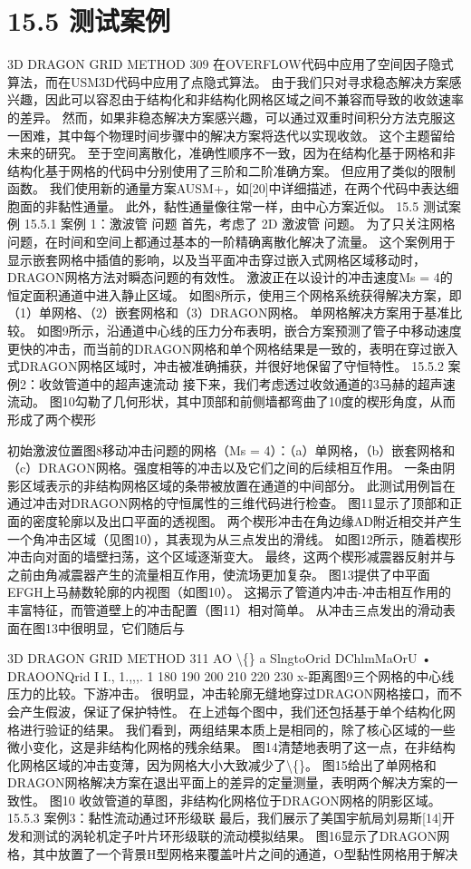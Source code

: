\documentclass[UTF8,11pt,a4paper,openany,fontset=fandol]{ctexbook}
\begin{document}
\section{15.5 测试案例}
3D DRAGON GRID METHOD 309 在OVERFLOW代码中应用了空间因子隐式算法，而在USM3D代码中应用了点隐式算法。 由于我们只对寻求稳态解决方案感兴趣，因此可以容忍由于结构化和非结构化网格区域之间不兼容而导致的收敛速率的差异。 然而，如果非稳态解决方案感兴趣，可以通过双重时间积分方法克服这一困难，其中每个物理时间步骤中的解决方案将迭代以实现收敛。 这个主题留给未来的研究。 至于空间离散化，准确性顺序不一致，因为在结构化基于网格和非结构化基于网格的代码中分别使用了三阶和二阶准确方案。 但应用了类似的限制函数。 我们使用新的通量方案AUSM+，如[20]中详细描述，在两个代码中表达细胞面的非黏性通量。 此外，黏性通量像往常一样，由中心方案近似。 15.5 测试案例 15.5.1 案例 1：激波管 问题 首先，考虑了 2D 激波管 问题。 为了只关注网格问题，在时间和空间上都通过基本的一阶精确离散化解决了流量。 这个案例用于显示嵌套网格中插值的影响，以及当平面冲击穿过嵌入式网格区域移动时，DRAGON网格方法对瞬态问题的有效性。 激波正在以设计的冲击速度Ms = 4的恒定面积通道中进入静止区域。 如图8所示，使用三个网格系统获得解决方案，即（1）单网格、（2）嵌套网格和（3）DRAGON网格。 单网格解决方案用于基准比较。 如图9所示，沿通道中心线的压力分布表明，嵌合方案预测了管子中移动速度更快的冲击，而当前的DRAGON网格和单个网格结果是一致的，表明在穿过嵌入式DRAGON网格区域时，冲击被准确捕获，并很好地保留了守恒特性。 15.5.2 案例2：收敛管道中的超声速流动 接下来，我们考虑透过收敛通道的3马赫的超声速流动。 图10勾勒了几何形状，其中顶部和前侧墙都弯曲了10度的楔形角度，从而形成了两个楔形

初始激波位置图8移动冲击问题的网格（Ms = 4）：（a）单网格，（b）嵌套网格和（c）DRAGON网格。强度相等的冲击以及它们之间的后续相互作用。 一条由阴影区域表示的非结构网格区域的条带被放置在通道的中间部分。 此测试用例旨在通过冲击对DRAGON网格的守恒属性的三维代码进行检查。 图11显示了顶部和正面的密度轮廓以及出口平面的透视图。 两个楔形冲击在角边缘AD附近相交并产生一个角冲击区域（见图10），其表现为从三点发出的滑线。 如图12所示，随着楔形冲击向对面的墙壁扫荡，这个区域逐渐变大。 最终，这两个楔形减震器反射并与之前由角减震器产生的流量相互作用，使流场更加复杂。 图13提供了中平面EFGH上马赫数轮廓的内视图（如图10）。 这揭示了管道内冲击-冲击相互作用的丰富特征，而管道壁上的冲击配置（图11）相对简单。 从冲击三点发出的滑动表面在图13中很明显，它们随后与

3D DRAGON GRID METHOD 311 AO \textbackslash\{\} a SlngtoOrid DChlmMaOrU • DRAOONQrid I I., 1.,,,. 1 180 190 200 210 220 230 x-距离图9三个网格的中心线压力的比较。下游冲击。 很明显，冲击轮廓无缝地穿过DRAGON网格接口，而不会产生假波，保证了保护特性。 在上述每个图中，我们还包括基于单个结构化网格进行验证的结果。 我们看到，两组结果本质上是相同的，除了核心区域的一些微小变化，这是非结构化网格的残余结果。 图14清楚地表明了这一点，在非结构化网格区域的冲击变薄，因为网格大小大致减少了\textbackslash\{\}。 图15给出了单网格和DRAGON网格解决方案在退出平面上的差异的定量测量，表明两个解决方案的一致性。 图10 收敛管道的草图，非结构化网格位于DRAGON网格的阴影区域。 15.5.3 案例3：黏性流动通过环形级联 最后，我们展示了美国宇航局刘易斯[14]开发和测试的涡轮机定子叶片环形级联的流动模拟结果。 图16显示了DRAGON网格，其中放置了一个背景H型网格来覆盖叶片之间的通道，O型黏性网格用于解决
\end{document}
